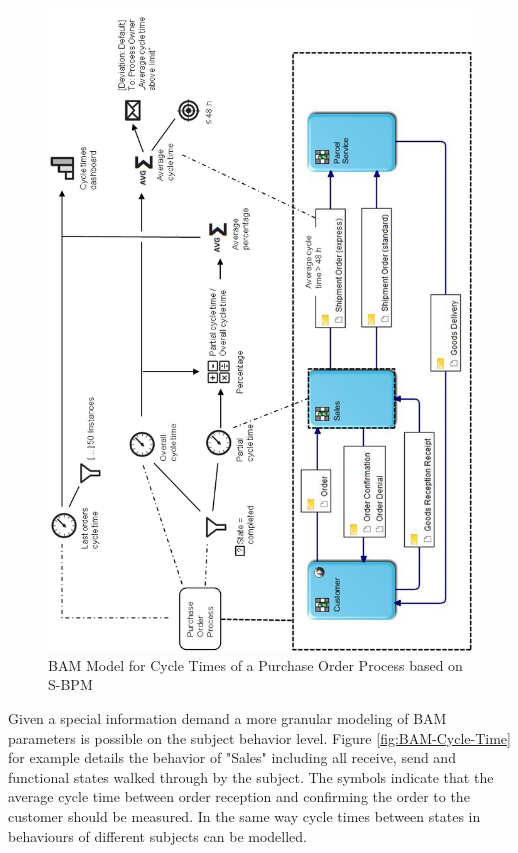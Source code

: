 \begin{figure}[h]
	\centering
	\includegraphics[width=0.9\linewidth]{Figures/Chapter5/Monitoring/BAM-Model-fo- Cycle-Times-of-a-Purchase-Order-Process-based-on-S-BPM.png}
	\caption[BAM Model for Cycle Times of a Purchase Order Process based on S-BPM]{BAM Model for Cycle Times of a Purchase Order Process based on S-BPM}
	\label{fig:Cycle-Time-SBPM}
\end{figure}

Given a special information demand a more granular modeling of BAM parameters is possible on the subject behavior level. Figure \ref{fig:BAM-Cycle-Time} for example details the behavior of "Sales" including all receive, send and functional states walked through by the subject. The symbols indicate that the average cycle time between order reception and confirming the order to the customer should be measured. In the same way cycle times between states in behaviours of different subjects can be modelled.


